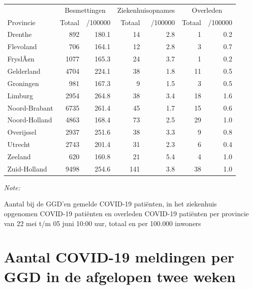 \documentclass[
  english,
  man,floatsintext]{apa6}
\begin{document}
\begin{table}
\centering
\begin{threeparttable}
\begin{tabular}{lrrrrrr}
\toprule
\multicolumn{1}{c}{ } & \multicolumn{2}{c}{Besmettingen} & \multicolumn{2}{c}{Ziekenhuisopnames} & \multicolumn{2}{c}{Overleden} \\
\cmidrule(l{3pt}r{3pt}){2-3} \cmidrule(l{3pt}r{3pt}){4-5} \cmidrule(l{3pt}r{3pt}){6-7}
Provincie & Totaal & /100000 & Totaal & /100000 & Totaal & /100000\\
\midrule
Drenthe & 892 & 180.1 & 14 & 2.8 & 1 & 0.2\\
Flevoland & 706 & 164.1 & 12 & 2.8 & 3 & 0.7\\
FryslÃ¢n & 1077 & 165.3 & 24 & 3.7 & 1 & 0.2\\
Gelderland & 4704 & 224.1 & 38 & 1.8 & 11 & 0.5\\
Groningen & 981 & 167.3 & 9 & 1.5 & 3 & 0.5\\
Limburg & 2954 & 264.8 & 38 & 3.4 & 18 & 1.6\\
Noord-Brabant & 6735 & 261.4 & 45 & 1.7 & 15 & 0.6\\
Noord-Holland & 4863 & 168.4 & 73 & 2.5 & 29 & 1.0\\
Overijssel & 2937 & 251.6 & 38 & 3.3 & 9 & 0.8\\
Utrecht & 2743 & 201.4 & 31 & 2.3 & 6 & 0.4\\
Zeeland & 620 & 160.8 & 21 & 5.4 & 4 & 1.0\\
Zuid-Holland & 9498 & 254.6 & 141 & 3.8 & 38 & 1.0\\
\bottomrule
\end{tabular}
\begin{tablenotes}
\item \textit{Note: } 
\item Aantal bij de GGD’en gemelde COVID-19 patiënten, in het ziekenhuis opgenomen COVID-19 patiënten en overleden COVID-19 patiënten per provincie van 22 mei t/m 05 juni 10:00 uur, totaal en per 100.000 inwoners
\end{tablenotes}
\end{threeparttable}
\end{table}

\newpage

\hypertarget{aantal-covid-19-meldingen-per-ggd-in-de-afgelopen-twee-weken}{%
\section{Aantal COVID-19 meldingen per GGD in de afgelopen twee weken}\label{aantal-covid-19-meldingen-per-ggd-in-de-afgelopen-twee-weken}}
\end{document}
